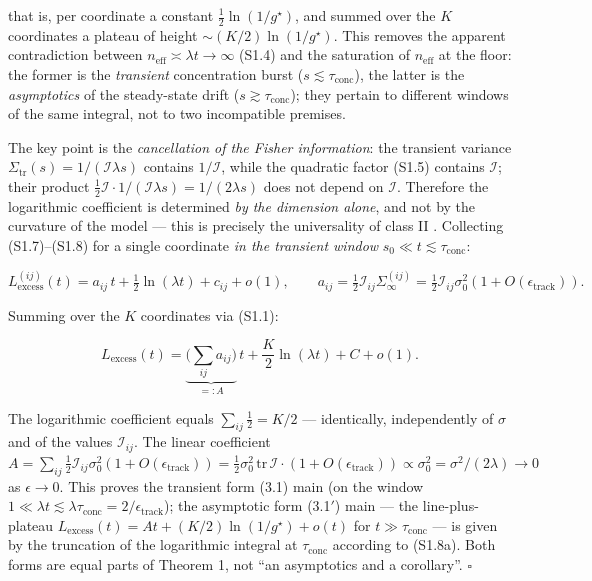 \documentclass[12pt]{iopart}
\begin{document}
that is, per coordinate a constant \(\tfrac12\ln(1/g^\star)\), and summed over the \(K\) coordinates a plateau of height \(\sim (K/2)\ln(1/g^\star)\). This removes the apparent contradiction between \(n_{\text{eff}}\asymp\lambda t\to\infty\) (S1.4) and the saturation of \(n_{\text{eff}}\) at the floor: the former is the \emph{transient} concentration burst (\(s \lesssim \tau_{\text{conc}}\)), the latter is the \emph{asymptotics} of the steady-state drift (\(s \gtrsim \tau_{\text{conc}}\)); they pertain to different windows of the same integral, not to two incompatible premises.



The key point is the \emph{cancellation of the Fisher information}: the transient variance \(\Sigma_{\text{tr}}(s) = 1/(\mathcal I\lambda s)\) contains \(1/\mathcal I\), while the quadratic factor (S1.5) contains \(\mathcal I\); their product \(\tfrac12\mathcal I\cdot 1/(\mathcal I\lambda s) = 1/(2\lambda s)\) does not depend on \(\mathcal I\). Therefore the logarithmic coefficient is determined \emph{by the dimension alone}, and not by the curvature of the model --- this is precisely the universality of class II \cite{BialekNemenmanTishby2001}. Collecting (S1.7)--(S1.8) for a single coordinate \emph{in the transient window} \(s_0 \ll t \lesssim \tau_{\text{conc}}\):



\begin{equation}L_{\text{excess}}^{(ij)}(t) = a_{ij}\,t + \tfrac12\ln(\lambda t) + c_{ij} + o(1), \qquad a_{ij} = \tfrac12\mathcal I_{ij}\Sigma_\infty^{(ij)} = \tfrac12\mathcal I_{ij}\sigma_0^2(1+O(\epsilon_{\text{track}})). \tag{S1.9}\end{equation}



Summing over the \(K\) coordinates via (S1.1):



\begin{equation}L_{\text{excess}}(t) = \underbrace{\Big(\sum_{ij}a_{ij}\Big)}_{=:A}\,t + \frac{K}{2}\ln(\lambda t) + C + o(1). \tag{S1.10}\end{equation}



The logarithmic coefficient equals \(\sum_{ij}\tfrac12 = K/2\) --- identically, independently of \(\sigma\) and of the values \(\mathcal I_{ij}\). The linear coefficient \(A = \sum_{ij}\tfrac12\mathcal I_{ij}\sigma_0^2(1+O(\epsilon_{\text{track}})) = \tfrac12\sigma_0^2\,\mathrm{tr}\,\mathcal I\cdot(1+O(\epsilon_{\text{track}})) \propto \sigma_0^2 = \sigma^2/(2\lambda) \to 0\) as \(\epsilon \to 0\). This proves the transient form (3.1) main (on the window \(1\ll\lambda t\lesssim\lambda\tau_{\text{conc}} = 2/\epsilon_{\text{track}}\)); the asymptotic form (3.1\('\)) main --- the line-plus-plateau \(L_{\text{excess}}(t) = At + (K/2)\ln(1/g^\star) + o(t)\) for \(t\gg\tau_{\text{conc}}\) --- is given by the truncation of the logarithmic integral at \(\tau_{\text{conc}}\) according to (S1.8a). Both forms are equal parts of Theorem 1, not ``an asymptotics and a corollary''. \(\square\)
\end{document}
